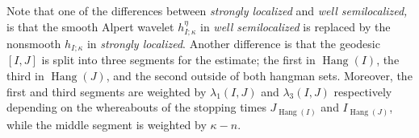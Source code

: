 \documentclass{amsart}%
\theoremstyle{plain}
\numberwithin{equation}{section}
\begin{document}
Note that one of the differences between \emph{strongly localized} and
\emph{well semilocalized,} is that the smooth Alpert wavelet $h_{I;\kappa
}^{\eta}$ in \emph{well semilocalized} is replaced by the nonsmooth
$h_{I;\kappa}$ in \emph{strongly localized}. Another difference is that the
geodesic $\left[  I,J\right]  $ is split into three segments for the estimate;
the first in $\operatorname*{Hang}\left(  I\right)  $, the third in
$\operatorname*{Hang}\left(  J\right)  $, and the second outside of both
hangman sets. Moreover, the first and third segments are weighted by
$\lambda_{1}\left(  I,J\right)  $ and $\lambda_{3}\left(  I,J\right)  $
respectively depending on the whereabouts of the stopping times
$J_{\operatorname*{Hang}\left(  I\right)  }$ and $I_{\operatorname*{Hang}%
\left(  J\right)  }$, while the middle segment is weighted by $\kappa-n$.
\end{document}
